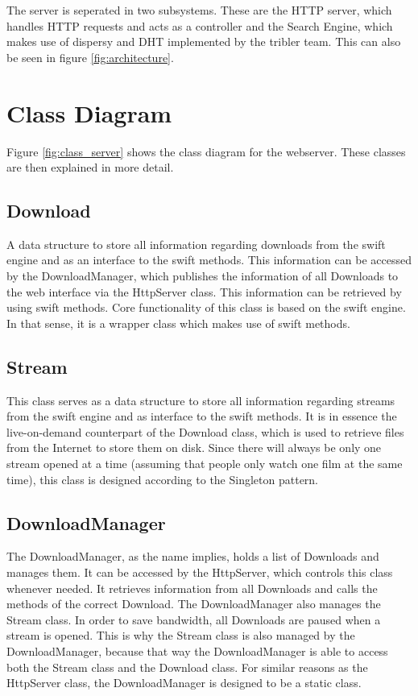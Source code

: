 The server is seperated in two subsystems. These are the HTTP server, which handles HTTP requests and acts as a controller and the Search Engine, 
which makes use of dispersy and DHT implemented by the tribler team. This can also be seen in figure \ref{fig:architecture}.


\section{Class Diagram}
Figure \ref{fig:class_server} shows the class diagram for the webserver. These classes are then explained in more detail.

\subsection{Download}
A data structure to store all information regarding downloads from the swift engine and as an interface to the swift methods.
This information can be accessed by the DownloadManager, which publishes the information of all Downloads to the web interface via
the HttpServer class. This information can be retrieved by using swift methods. Core functionality of this class is based on the swift engine.
In that sense, it is a wrapper class which makes use of swift methods.

\subsection{Stream}
This class serves as a data structure to store all information regarding streams from the swift engine and as interface to the swift methods. It 
is in essence the live-on-demand counterpart of the Download class, which is used to retrieve files from the Internet to store them on disk.
Since there will always be only one stream opened at a time (assuming that people only watch one film at the same time),
this class is designed according to the Singleton pattern.

\subsection{DownloadManager}
The DownloadManager, as the name implies, holds a list of Downloads and manages them. It can be accessed by the HttpServer, which controls this
class whenever needed. It retrieves information from all Downloads and calls the methods of the correct Download. The DownloadManager also manages
 the Stream class. In order to save bandwidth, all Downloads are paused when a stream is opened. This is why the Stream class is also managed by
 the DownloadManager, because that way the DownloadManager is able to access both the Stream class and the Download class. For similar reasons as
 the HttpServer class, the DownloadManager is designed to be a static class.

